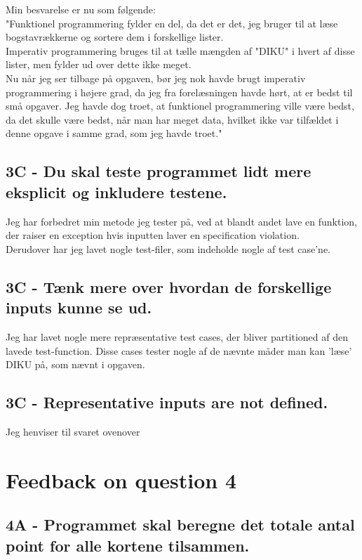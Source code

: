 \documentclass[a4paper,12pt]{article}
\begin{document}
Min besvarelse er nu som følgende:\\
"Funktionel programmering fylder en del, da det er det, jeg bruger til at læse bogstavrækkerne og sortere dem i forskellige lister.\\
Imperativ programmering bruges til at tælle mængden af "DIKU" i hvert af disse lister, men fylder ud over dette ikke meget.\\
Nu når jeg ser tilbage på opgaven, bør jeg nok havde brugt imperativ programmering i højere grad, da jeg fra forelæsningen havde hørt, at er bedst til små opgaver. Jeg havde dog troet, at funktionel programmering ville være bedst, da det skulle være bedst, når man har meget data, hvilket ikke var tilfældet i denne opgave i samme grad, som jeg havde troet."


\subsection*{3C - Du skal teste programmet lidt mere eksplicit og inkludere testene.}

Jeg har forbedret min metode jeg tester på, ved at blandt andet lave en funktion, der raiser en exception hvis inputten laver en specification violation.\\
Derudover har jeg lavet nogle test-filer, som indeholde nogle af test case'ne.

\subsection*{3C - Tænk mere over hvordan de forskellige inputs kunne se ud.}

Jeg har lavet nogle mere repræsentative test cases, der bliver partitioned af den lavede test-function. Disse cases tester nogle af de nævnte måder man kan 'læse' DIKU på, som nævnt i opgaven.

\subsection*{3C - Representative inputs are not defined.}

Jeg henviser til svaret ovenover

\section{Feedback on question 4}

\subsection*{4A - Programmet skal beregne det totale antal point for alle kortene tilsammen.}
\end{document}

